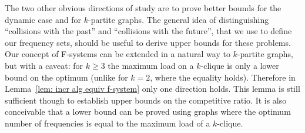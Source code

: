 \documentclass[11pt]{article}
\begin{document}
The two other obvious directions of study are to prove better bounds
for the dynamic case and for $k$-partite graphs. The general idea
of distinguishing ``collisions with the past'' and 
``collisions with the future'', that we use to define our 
frequency sets, should be useful to derive upper bounds for these
problems. Our concept of
F-systems can be extended in a natural way to $k$-partite graphs,
but with a caveat: for $k\ge 3$ the maximum load on a $k$-clique
is only a lower bound on the optimum (unlike for $k=2$, where the
equality holds).
Therefore in Lemma~\ref{lem: incr alg equiv f-system} only one
direction holds. This lemma is still sufficient though to establish
upper bounds on the competitive ratio. It is also conceivable that
a lower bound can be proved using graphs where the optimum
number of frequencies is equal to the maximum load of a $k$-clique.




\end{document}
